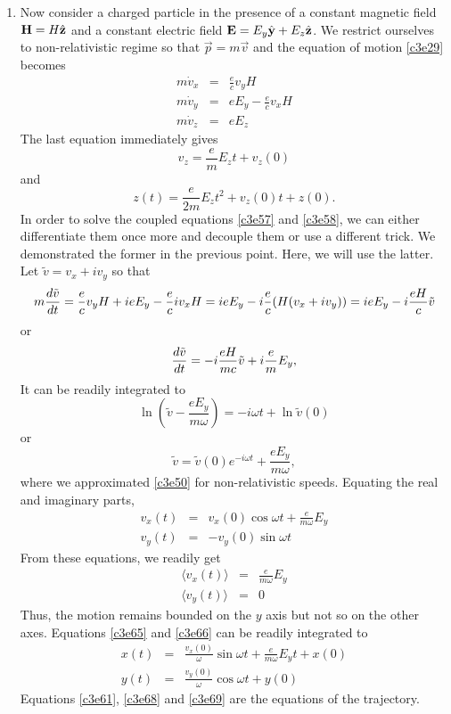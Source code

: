 \begin{enumerate}
\item Now consider a charged particle in the presence of a constant magnetic field
$\mathbf{H} = H\hat{\mathbf{z}}$ and a constant electric field $\mathbf{E} = E_y\hat{\mathbf{y}} + E_z\hat{\mathbf{z}}$.
We restrict ourselves to non-relativistic regime so that $\vec{p} = m\vec{v}$ and
the equation of motion \eqref{c3e29} becomes
\begin{eqnarray}
m\dot{v}_x &=& \frac{e}{c}v_yH \label{c3e58} \\
m\dot{v}_y &=& eE_y - \frac{e}{c}v_xH \label{c3e59} \\
m\dot{v}_z &=& eE_z \label{c3e60}
\end{eqnarray}
The last equation immediately gives
\[
v_z = \frac{e}{m}E_zt + v_z(0)
\]
and
\begin{equation}\label{c3e61}
z(t) = \frac{e}{2m}E_zt^2 + v_z(0)t + z(0).
\end{equation}
In order to solve the coupled equations \eqref{c3e57} and \eqref{c3e58}, we can 
either differentiate them once more and decouple them or use a different trick.
We demonstrated the former in the previous point. Here, we will use the latter.
Let $\tilde{v} = v_x + iv_y$ so that
\[
m\frac{d{\tilde{v}}}{d{t}} = \frac{e}{c}v_yH + ieE_y - \frac{e}{c}{iv_xH}
= ieE_y -i\frac{e}{c}(H(v_x + iv_y)) = ieE_y - i\frac{eH}{c}\tilde{v}
\]
or
\begin{equation}\label{c3e62}
\frac{d{\tilde{v}}}{d{t}} = -i\frac{eH}{mc}\tilde{v} + i\frac{e}{m}E_y,
\end{equation}
It can be readily integrated to
\[
\ln\left(\tilde{v} - \frac{eE_y}{m\omega}\right) = -i\omega t + \ln\tilde{v}(0)
\]
or
\begin{equation}\label{c3e63}
\tilde{v} = \tilde{v}(0)e^{-i\omega t} + \frac{eE_y}{m\omega},
\end{equation}
where we approximated \eqref{c3e50} for non-relativistic speeds. Equating the
real and imaginary parts,
\begin{eqnarray}
v_x(t) &=& v_x(0)\cos\omega t  + \frac{e}{m\omega}E_y\label{c3e64} \\
v_y(t) &=& -v_y(0)\sin\omega t \label{c3e65}
\end{eqnarray}
From these equations, we readily get
\begin{eqnarray}
\langle v_x(t) \rangle &=& \frac{e}{m\omega}E_y \label{c3e66} \\
\langle v_y(t) \rangle &=& 0 \label{c3e67}
\end{eqnarray}
Thus, the motion remains bounded on the $y$ axis but not so on the other axes. 
Equations \eqref{c3e65} and \eqref{c3e66} can be readily integrated to
\begin{eqnarray}
x(t) &=& \frac{v_x(0)}{\omega}\sin\omega t + \frac{e}{m\omega}E_yt + x(0) \label{c3e68} \\
y(t) &=& \frac{v_y(0)}{\omega}\cos\omega t + y(0) \label{c3e69}
\end{eqnarray}
Equations \eqref{c3e61}, \eqref{c3e68} and \eqref{c3e69} are the equations of the
trajectory.


\end{enumerate}

